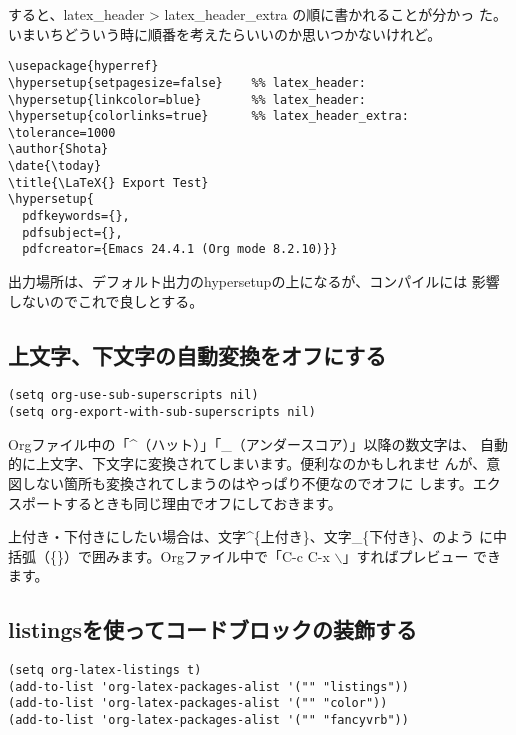 \documentclass[dvipdfmx,12pt]{jsarticle}
\begin{document}
すると、latex\_header > latex\_header\_extra の順に書かれることが分かっ
た。いまいちどういう時に順番を考えたらいいのか思いつかないけれど。

\lstset{language=[LaTeX]TeX,label= ,caption= ,numbers=none}
\begin{lstlisting}
\usepackage{hyperref}
\hypersetup{setpagesize=false}    %% latex_header:
\hypersetup{linkcolor=blue}       %% latex_header:
\hypersetup{colorlinks=true}      %% latex_header_extra:
\tolerance=1000
\author{Shota}
\date{\today}
\title{\LaTeX{} Export Test}
\hypersetup{
  pdfkeywords={},
  pdfsubject={},
  pdfcreator={Emacs 24.4.1 (Org mode 8.2.10)}}
\end{lstlisting}

出力場所は、デフォルト出力のhypersetupの上になるが、コンパイルには
影響しないのでこれで良しとする。

\subsection{上文字、下文字の自動変換をオフにする}
\label{sec-4-8}

\lstset{language=Lisp,label= ,caption= ,numbers=none}
\begin{lstlisting}
(setq org-use-sub-superscripts nil)
(setq org-export-with-sub-superscripts nil)
\end{lstlisting}

Orgファイル中の「\^{}（ハット）」「\_（アンダースコア）」以降の数文字は、
自動的に上文字、下文字に変換されてしまいます。便利なのかもしれませ
んが、意図しない箇所も変換されてしまうのはやっぱり不便なのでオフに
します。エクスポートするときも同じ理由でオフにしておきます。

上付き・下付きにしたい場合は、文字\^{}\{上付き\}、文字\_\{下付き\}、のよう
に中括弧（\{\}）で囲みます。Orgファイル中で「C-c C-x $\backslash$」すればプレビュー
できます。

\subsection{listingsを使ってコードブロックの装飾する}
\label{sec-4-9}

\lstset{language=Lisp,label= ,caption= ,numbers=none}
\begin{lstlisting}
(setq org-latex-listings t)
(add-to-list 'org-latex-packages-alist '("" "listings"))
(add-to-list 'org-latex-packages-alist '("" "color"))
(add-to-list 'org-latex-packages-alist '("" "fancyvrb"))
\end{lstlisting}
\end{document}
